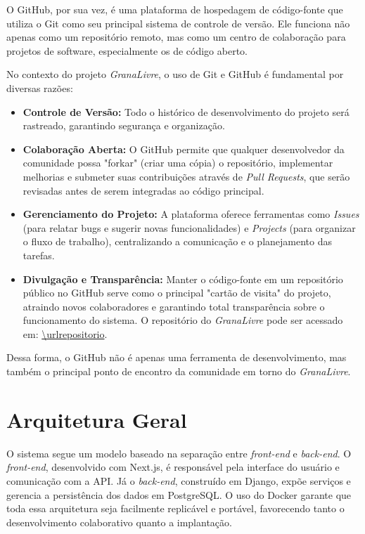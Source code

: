 O GitHub, por sua vez, é uma plataforma de hospedagem de código-fonte que utiliza o Git como seu principal sistema de controle de versão. Ele funciona não apenas como um repositório remoto, mas como um centro de colaboração para projetos de software, especialmente os de código aberto.

No contexto do projeto \textit{GranaLivre}, o uso de Git e GitHub é fundamental por diversas razões:
\begin{itemize}
\item \textbf{Controle de Versão:} Todo o histórico de desenvolvimento do projeto será rastreado, garantindo segurança e organização.
\item \textbf{Colaboração Aberta:} O GitHub permite que qualquer desenvolvedor da comunidade possa "forkar" (criar uma cópia) o repositório, implementar melhorias e submeter suas contribuições através de \textit{Pull Requests}, que serão revisadas antes de serem integradas ao código principal.
\item \textbf{Gerenciamento do Projeto:} A plataforma oferece ferramentas como \textit{Issues} (para relatar bugs e sugerir novas funcionalidades) e \textit{Projects} (para organizar o fluxo de trabalho), centralizando a comunicação e o planejamento das tarefas.
\item \textbf{Divulgação e Transparência:} Manter o código-fonte em um repositório público no GitHub serve como o principal "cartão de visita" do projeto, atraindo novos colaboradores e garantindo total transparência sobre o funcionamento do sistema. O repositório do \textit{GranaLivre} pode ser acessado em: \url{\urlrepositorio}.
\end{itemize}
Dessa forma, o GitHub não é apenas uma ferramenta de desenvolvimento, mas também o principal ponto de encontro da comunidade em torno do \textit{GranaLivre}.

\section{Arquitetura Geral}
O sistema segue um modelo baseado na separação entre \textit{front-end} e \textit{back-end}. O \textit{front-end}, desenvolvido com Next.js, é responsável pela interface do usuário e comunicação com a API. Já o \textit{back-end}, construído em Django, expõe serviços e gerencia a persistência dos dados em PostgreSQL.  
O uso do Docker garante que toda essa arquitetura seja facilmente replicável e portável, favorecendo tanto o desenvolvimento colaborativo quanto a implantação.

